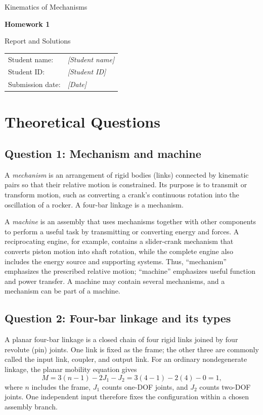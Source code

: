 \documentclass[11pt,a4paper]{article}
\newcommand{\studentname}{\textit{[Student name]}}
\newcommand{\studentid}{\textit{[Student ID]}}
\begin{document}
\hypersetup{pageanchor=false}
\begin{titlepage}
  \centering
  \vspace*{32mm}
  {\Large Kinematics of Mechanisms\par}
  \vspace{9mm}
  {\huge\bfseries Homework 1\par}
  \vspace{14mm}
  {\Large Report and Solutions\par}
  \vfill
  \begin{tabular}{@{}ll@{}}
    Student name: & \studentname\\[2mm]
    Student ID: & \studentid\\[2mm]
    Submission date: & \textit{[Date]}
  \end{tabular}
  \vspace*{20mm}
\end{titlepage}

\hypersetup{pageanchor=true}
\tableofcontents
\newpage

\section{Theoretical Questions}

\subsection{Question 1: Mechanism and machine}
A \emph{mechanism} is an arrangement of rigid bodies (links) connected by
kinematic pairs so that their relative motion is constrained. Its purpose is
to transmit or transform motion, such as converting a crank's continuous
rotation into the oscillation of a rocker. A four-bar linkage is a mechanism.

A \emph{machine} is an assembly that uses mechanisms together with other
components to perform a useful task by transmitting or converting energy and
forces. A reciprocating engine, for example, contains a slider-crank
mechanism that converts piston motion into shaft rotation, while the complete
engine also includes the energy source and supporting systems. Thus,
``mechanism'' emphasizes the prescribed relative motion; ``machine''
emphasizes useful function and power transfer. A machine may contain several
mechanisms, and a mechanism can be part of a machine.

\subsection{Question 2: Four-bar linkage and its types}
A planar four-bar linkage is a closed chain of four rigid links joined by four
revolute (pin) joints. One link is fixed as the frame; the other three are
commonly called the input link, coupler, and output link. For an ordinary
nondegenerate linkage, the planar mobility equation gives
\begin{equation}
  M=3(n-1)-2J_1-J_2=3(4-1)-2(4)-0=1,
  \label{eq:fourbar-mobility}
\end{equation}
where $n$ includes the frame, $J_1$ counts one-DOF joints, and $J_2$
counts two-DOF joints. One independent input therefore fixes the
configuration within a chosen assembly branch.
\end{document}
